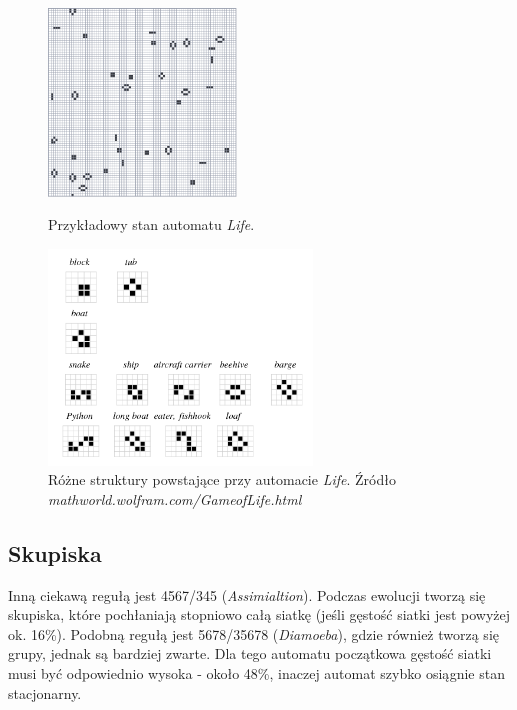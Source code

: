 \documentclass[12pt]{article}
\begin{document}
\begin{figure}[H]
\centering
\parbox{5cm}{
\includegraphics[width=5cm]{life.png}
\caption{Przykładowy stan automatu \textit{Life}. }
\label{fig:2figsA}}
\qquad
\begin{minipage}{7cm}
\includegraphics[width=7cm]{struktury.png}
\caption{Różne struktury powstające przy automacie \textit{Life}. Źródło \textit{mathworld.wolfram.com/GameofLife.html}}
\label{fig:2figsB}
\end{minipage}
\end{figure}

\subsection{Skupiska}
Inną ciekawą regułą jest 4567/345 (\textit{Assimialtion}). Podczas ewolucji tworzą się skupiska, które pochłaniają stopniowo całą siatkę (jeśli gęstość siatki jest powyżej ok. 16\%). Podobną regułą jest 5678/35678 (\textit{Diamoeba}), gdzie również tworzą się grupy, jednak są bardziej zwarte. Dla tego automatu początkowa gęstość siatki musi być odpowiednio wysoka - około 48\%, inaczej automat szybko osiągnie stan stacjonarny.
\end{document}
